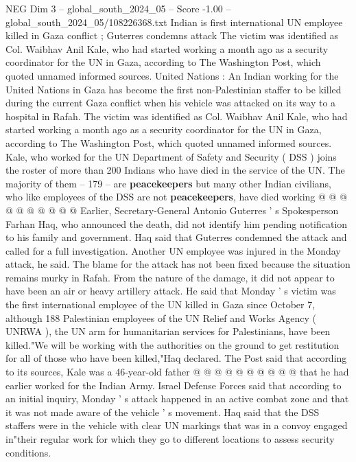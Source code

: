 \begin{textsample}{NEG Dim 3 – global\_south\_2024\_05 – Score -1.00 – global\_south\_2024\_05/108226368.txt}  \label{ex:f3_neg_350}
Indian is first international UN employee killed in Gaza conflict ; Guterres condemns attack The victim was identified as Col.
Waibhav Anil Kale, who had started working a month ago as a security coordinator for the UN in Gaza, according to The Washington Post, which quoted unnamed informed sources.
United Nations : An Indian working for the United Nations in Gaza has become the first non-Palestinian staffer to be killed during the current Gaza conflict when his vehicle was attacked on its way to a hospital in Rafah.
The victim was identified as Col.
Waibhav Anil Kale, who had started working a month ago as a security coordinator for the UN in Gaza, according to The Washington Post, which quoted unnamed informed sources.
Kale, who worked for the UN Department of Safety and Security ( DSS ) joins the roster of more than 200 Indians who have died in the service of the UN.
The majority of them -- 179 -- are \textbf{peacekeepers} but many other Indian civilians, who like employees of the DSS are not \textbf{peacekeepers}, have died working @ @ @ @ @ @ @ @ @ @ Earlier, Secretary-General Antonio Guterres ' s Spokesperson Farhan Haq, who announced the death, did not identify him pending notification to his family and government.
Haq said that Guterres condemned the attack and called for a full investigation.
Another UN employee was injured in the Monday attack, he said.
The blame for the attack has not been fixed because the situation remains murky in Rafah.
From the nature of the damage, it did not appear to have been an air or heavy artillery attack.
He said that Monday ' s victim was the first international employee of the UN killed in Gaza since October 7, although 188 Palestinian employees of the UN Relief and Works Agency ( UNRWA ), the UN arm for humanitarian services for Palestinians, have been killed."We will be working with the authorities on the ground to get restitution for all of those who have been killed,"Haq declared.
The Post said that according to its sources, Kale was a 46-year-old father @ @ @ @ @ @ @ @ @ @ that he had earlier worked for the Indian Army.
Israel Defense Forces said that according to an initial inquiry, Monday ' s attack happened in an active combat zone and that it was not made aware of the vehicle ' s movement.
Haq said that the DSS staffers were in the vehicle with clear UN markings that was in a convoy engaged in"their regular work for which they go to different locations to assess security conditions.

\end{textsample}
